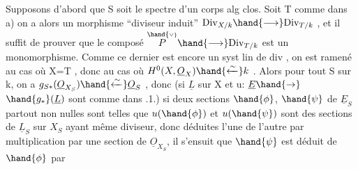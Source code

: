 Supposons d'abord que S soit le spectre d'un corps  alg clos. 
Soit T comme dans a) on a alors un morphisme ``diviseur induit''
$\mathrm{Div}_{X/k} \hand{\longrightarrow} \mathrm{Div}_{T/k}$ , et il suffit de prouver que le composé $\overset{\hand{\scriptscriptstyle\vee}}{P} \hand{\longrightarrow} \mathrm{Div}_{T/k}$
est un monomorphisme. Comme ce dernier est encore un syst lin de div ,
on est ramené au cas où X=T , donc au cas où $H^0(X,\underline{O}_X) \hand{\xleftarrow{\sim}} k$ . Alors pour
tout S sur k, on a $g_{S*}(\underline{O}_{X_S}) \hand{\xleftarrow{\sim}} \underline{O}_S$ , donc (si $\underline{L}$ sur X et u: $\underline{E} \hand{\to}$ $\hand{g_*}(\underline{L})$
sont comme dans .1.) si deux sections $\hand{\phi}$, $\hand{\psi}$ de $\underline{E}_S$ partout non nulles
sont telles que $u(\hand{\phi})$ et $u(\hand{\psi})$ sont des sections de $\underline{L}_S$ sur $X_S$ ayant même
diviseur, donc  déduites l'une de l'autre par multiplication par
une section  de $\underline{O}_{X_S}$, il s'ensuit que $\hand{\psi}$ est déduit de $\hand{\phi}$ par 

